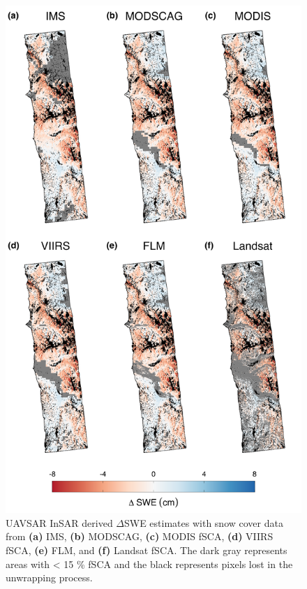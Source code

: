 \clearpage
\begin{figure}[t]
\includegraphics[width=\textwidth]{figures/ch4_figs/dswe_uavsar_v2.png}
\centering
\caption{UAVSAR InSAR derived $\Delta$SWE estimates with snow cover data from \textbf{(a)} IMS, \textbf{(b)} MODSCAG, \textbf{(c)} MODIS fSCA, \textbf{(d)} VIIRS fSCA, \textbf{(e)} FLM, and \textbf{(f)} Landsat fSCA. The dark gray represents areas with < 15 \% fSCA and the black represents pixels lost in the unwrapping process.}
\label{fig:uavsar_dswe}
\end{figure}

